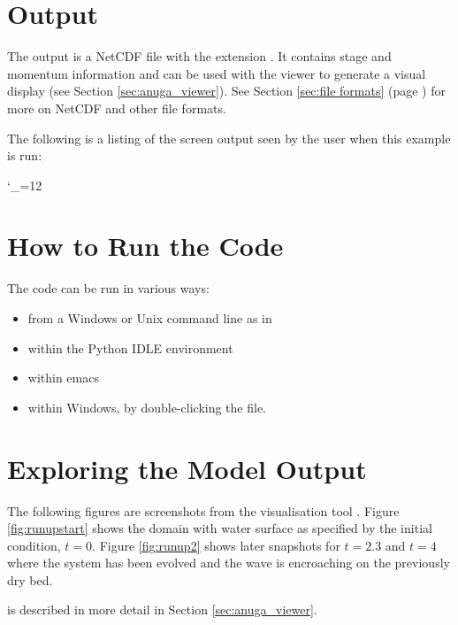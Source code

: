 \documentclass{manual}
\newcommand{\verbatiminputB}[1]{%
\endgroup}
\def\verbatiminputunderscore{\begingroup 
\catcode`\_=12
\verbatiminputB}
\begin{document}
\section{Output}

The output is a NetCDF file with the extension . It
contains stage and momentum information and can be used with the
\anuga viewer  to generate a visual
display (see Section \ref{sec:anuga_viewer}). See Section \ref{sec:file formats}
(page \pageref{sec:file formats}) for more on NetCDF and other file
formats.

The following is a listing of the screen output seen by the user
when this example is run:

\verbatiminputunderscore{examples/runupoutput.txt}


\section{How to Run the Code}

The code can be run in various ways:
\begin{itemize}
  \item{from a Windows or Unix command line} as in\ 
  \item{within the Python IDLE environment}
  \item{within emacs}
  \item{within Windows, by double-clicking the 
  file.}
\end{itemize}


\section{Exploring the Model Output}

The following figures are screenshots from the \anuga visualisation
tool . Figure \ref{fig:runupstart} shows the domain
with water surface as specified by the initial condition, $t=0$.
Figure \ref{fig:runup2} shows later snapshots for $t=2.3$ and
$t=4$ where the system has been evolved and the wave is encroaching
on the previously dry bed.

 is described in more detail in Section \ref{sec:anuga_viewer}.
\end{document}
